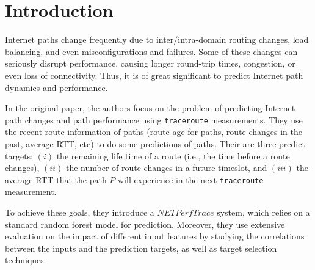 \documentclass[sigconf]{acmart}
\newcommand{\hui}[1]{{\bf \color{purple} [[Zhenghui says ``#1'']]}}
\begin{document}
	
	
	
	
	\maketitle
	
	
	\section{Introduction}
	Internet paths change frequently due to inter/intra-domain routing changes, load balancing, and even misconfigurations and failures\cite{1}.
	Some of these changes can seriously disrupt performance, causing longer round-trip times, congestion, or even loss of connectivity\cite{2}.
	Thus, it is of great significant to predict Internet path dynamics and performance.
	
	In the original paper\cite{oripaper}, the authors focus on the problem of predicting Internet path changes and path performance using \texttt{traceroute} measurements. They use the recent route information of paths (route age for paths, route changes in the past, average RTT, etc) to do some predictions of paths. Their are three predict targets: $(i)$ the remaining life time of a route (i.e., the time before a route changes), $(ii)$ the number of route changes in a future timeslot, and $(iii)$ the average RTT  that the path $P$ will experience in the next \texttt{traceroute} measurement.
	
	To achieve these goals, they introduce a $NETPerfTrace$ system, which relies on a standard random forest model for prediction. Moreover, they use extensive evaluation on the impact of different input features by studying the correlations between the inputs and the prediction targets, as well as target selection techniques.
	
\end{document}
